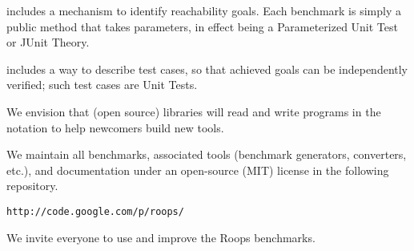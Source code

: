  includes a mechanism to identify reachability goals. 
Each  benchmark is simply a public method that takes parameters,
in effect being a Parameterized Unit Test\cite{} or JUnit Theory\cite{}.

 includes a way to describe test cases, 
so that achieved goals can be independently verified;
such test cases are Unit Tests\cite{}.

We envision that (open source) libraries will read and write programs in the
 notation to help newcomers build new tools.

We maintain all  benchmarks, associated tools (benchmark generators, 
converters, etc.), and documentation under an open-source (MIT) license in the
following repository.

\verb|http://code.google.com/p/roops/|

We invite everyone to use and improve the Roops benchmarks.